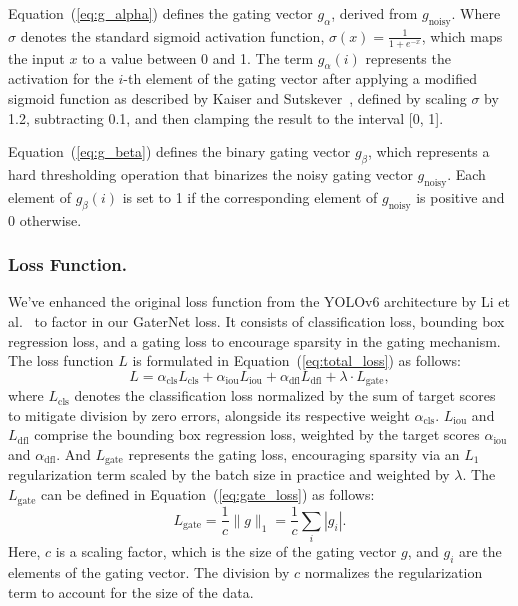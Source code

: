 \documentclass[runningheads]{llncs}
\begin{document}
Equation~(\ref{eq:g_alpha}) defines the gating vector \( g_{\alpha} \), derived from \( g_{\text{noisy}} \). Where \( \sigma \) denotes the standard sigmoid activation function, \( \sigma(x) = \frac{1}{1 + e^{-x}} \), which maps the input \( x \) to a value between 0 and 1. The term \( g_{\alpha}(i) \) represents the activation for the \( i \)-th element of the gating vector after applying a modified sigmoid function as described by Kaiser and Sutskever~\cite{kaiser2015neural}, defined by scaling \( \sigma \) by 1.2, subtracting 0.1, and then clamping the result to the interval [0, 1].

Equation~(\ref{eq:g_beta}) defines the binary gating vector \( g_{\beta} \), which represents a hard thresholding operation that binarizes the noisy gating vector \( g_{\text{noisy}} \). Each element of \( g_{\beta}(i) \) is set to 1 if the corresponding element of \( g_{\text{noisy}} \) is positive and 0 otherwise.

\subsubsection*{Loss Function.} We’ve enhanced the original loss function from the YOLOv6 architecture by Li et al.~\cite{li2023yolov6,li2022yolov6} to factor in our GaterNet loss. It consists of classification loss, bounding box regression loss, and a gating loss to encourage sparsity in the gating mechanism. The loss function \( L \) is formulated in Equation~(\ref{eq:total_loss}) as follows:\begin{equation}
L = \alpha_{\text{cls}} L_{\text{cls}} + \alpha_{\text{iou}} L_{\text{iou}} + \alpha_{\text{dfl}} L_{\text{dfl}} + \lambda \cdot L_{\text{gate}}, \label{eq:total_loss}
\end{equation} where \( L_{\text{cls}} \) denotes the classification loss normalized by the sum of target scores to mitigate division by zero errors, alongside its respective weight \( \alpha_{\text{cls}} \). \( L_{\text{iou}} \) and \( L_{\text{dfl}} \) comprise the bounding box regression loss, weighted by the target scores \( \alpha_{\text{iou}} \) and \( \alpha_{\text{dfl}} \). And \( L_{\text{gate}} \) represents the gating loss, encouraging sparsity via an \( L_1 \) regularization term scaled by the batch size in practice and weighted by \( \lambda \). The \( L_{\text{gate}} \) can be defined in Equation~(\ref{eq:gate_loss}) as follows:
\begin{equation}
L_{\text{gate}} = \frac{1}{c} \| g \|_1 = \frac{1}{c} \sum_{i} | g_i |.  \label{eq:gate_loss}
\end{equation}
Here, \( c \) is a scaling factor, which is the size of the gating vector \( g \), and \( g_i \) are the elements of the gating vector. The division by \( c \) normalizes the regularization term to account for the size of the data.
\end{document}
